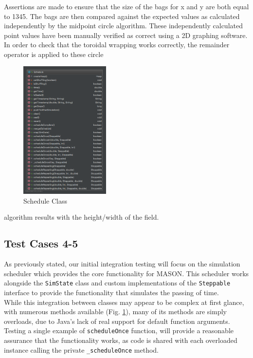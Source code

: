 \documentclass[11pt]{article}
\begin{document}
Assertions are made to ensure that the size of the bags for x and y are both equal to 1345.
The bags are then compared against the expected values as calculated independently by the midpoint circle algorithm.
These independently calculated point values have been manually verified as correct using a 2D graphing software.
In order to check that the toroidal wrapping works correctly, the remainder operator is applied to these circle
\begin{figure} 
	\vspace{-25pt}
	\begin{center}
		\includegraphics[width=0.4\textwidth]{Appendix/Schedule}
		\caption{Schedule Class}
		\label{fig:schedule}
	\end{center}
\end{figure} algorithm results with the height/width of the field.

\subsection{Test Cases 4-5}

As previously stated, our initial integration testing will focus on the simulation scheduler which provides the core functionality for MASON.
This scheduler works alongside the \texttt{SimState} class and custom implementations of the \texttt{Steppable} interface to provide the functionality that simulates the passing of time.
\\

While this integration between classes may appear to be complex at first glance, with numerous methods available (Fig. \ref{fig:schedule}), many of its methods are simply overloads,  due to Java's lack of real support for default function arguments.
Testing a single example of \texttt{scheduleOnce} function, will provide a reasonable assurance that the functionality works, as code is shared with each overloaded instance calling the private \texttt{\_scheduleOnce} method.
\\
\end{document}
